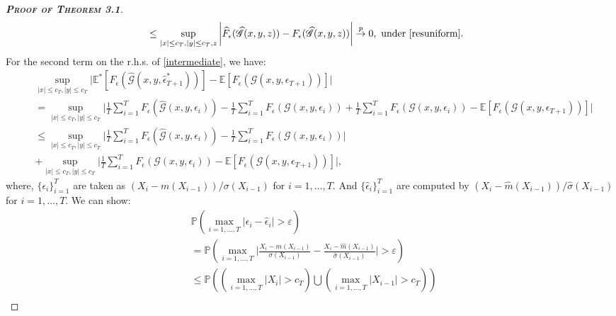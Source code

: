 \documentclass[a4paper]{article}
\begin{document}
\begin{proof}[\textbf{\textsc{Proof of Theorem 3.1}}]
\begin{equation}
\begin{split}
    & \leq \sup_{|x|\leq c_T, |y|\leq c_T, z} \bigg\vert \widehat{F}_{\epsilon}(\widehat{\mathcal{G}}(x, y,z)) -  F_{\epsilon}(\widehat{\mathcal{G}}(x, y,z))  \bigg\vert \overset{p}{\to} 0,~\text{under \cref{resuniform}}.
\end{split}
\end{equation}
For the second term on the r.h.s. of \cref{intermediate}, we have:
\begin{equation}\label{part2}
\begin{split}
    &\sup_{|x|\leq c_T, |y|\leq c_T}\bigg\vert  \mathbb{E}^*\left[ F_{\epsilon}(\widehat{\mathcal{G}}(x, y,\hat{\epsilon}^*_{T+1})) \right] -  \mathbb{E}\left[F_{\epsilon}\left( \mathcal{G}(x,y,\epsilon_{T+1})   \right)\right]   \bigg\vert \\
    & = \sup_{|x|\leq c_T, |y|\leq c_T}\bigg\vert \frac{1}{T}\sum_{i=1}^{T}F_{\epsilon}(\widehat{\mathcal{G}}(x,y,\hat{\epsilon}_i)) -  \frac{1}{T}\sum_{i=1}^{T}F_{\epsilon}(\mathcal{G}(x,y,\epsilon_i))  + \frac{1}{T}\sum_{i=1}^{T}F_{\epsilon}(\mathcal{G}(x,y,\epsilon_i)) - \mathbb{E}\left[F_{\epsilon}\left( \mathcal{G}(x,y,\epsilon_{T+1})   \right)\right]     \bigg\vert \\
    &\leq \sup_{|x|\leq c_T, |y|\leq c_T}\bigg\vert \frac{1}{T}\sum_{i=1}^{T}F_{\epsilon}(\widehat{\mathcal{G}}(x,y,\hat{\epsilon}_i)) -  \frac{1}{T}\sum_{i=1}^{T}F_{\epsilon}(\mathcal{G}(x,y,\epsilon_i))    \bigg\vert\\
    &+ \sup_{|x|\leq c_T, |y|\leq c_T}\bigg\vert \frac{1}{T}\sum_{i=1}^{T}F_{\epsilon}(\mathcal{G}(x,y,\epsilon_i)) - \mathbb{E}\left[F_{\epsilon}\left( \mathcal{G}(x,y,\epsilon_{T+1})   \right)\right]      \bigg\vert, 
\end{split}
\end{equation}
where, $\{\epsilon_i\}_{i=1}^{T}$ are taken as $(X_i - m(X_{i-1}))/\sigma(X_{i-1})$ for $i=1,\ldots,T$. And $\{\hat{\epsilon}_i\}_{i=1}^{T}$ are computed by $(X_i - \widehat{m}(X_{i-1}))/\widehat{\sigma}(X_{i-1})$ for $i=1,\ldots,T$. We can show:
\begin{equation}\label{epandhatep}
\begin{split}
    &\mathbb{P}\left(\max_{i=1,\ldots,T}\bigg\vert\epsilon_i - \hat{\epsilon}_i\bigg\vert>\varepsilon\right)\\
    & = \mathbb{P}\left(\max_{i=1,\ldots,T}\bigg\vert \frac{X_i - m(X_{i-1})}{\sigma(X_{i-1})} - \frac{X_i - \widehat{m}(X_{i-1})}{\widehat{\sigma}(X_{i-1})}          \bigg\vert>\varepsilon\right)\\
    & \leq \mathbb{P}\left(\left(\max_{i=1,\ldots,T}|X_i|>c_T \right) \bigcup \left(\max_{i=1,\ldots,T}|X_{i-1}|>c_T\right) \right) \\

\end{split}
\end{equation}
\end{proof}
\end{document}
